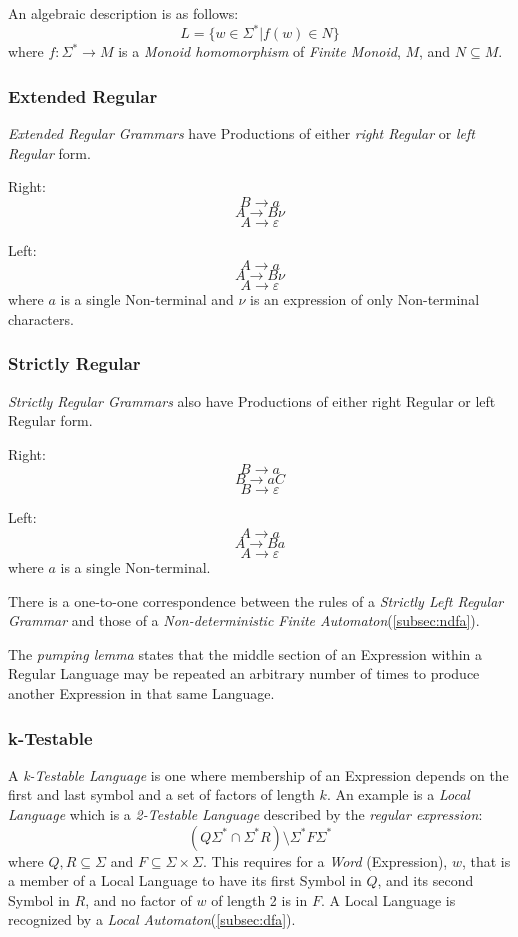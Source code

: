 \documentclass{article}
\begin{document}
An algebraic description is as follows:
\[
    L = \{ w \in \Sigma^* | f(w) \in N \}
\]
where $f : \Sigma^* \rightarrow M$ is a \emph{Monoid homomorphism} of
\emph{Finite Monoid}, $M$, and $N \subseteq M$.

\subsubsection{Extended Regular}
\emph{Extended Regular Grammars} have Productions of either \emph{right
Regular} or \emph{left Regular} form.

Right:
\[
    B \rightarrow a
\]\[
    A \rightarrow B \nu
\]\[
    A \rightarrow \varepsilon
\]

Left:
\[
    A \rightarrow a
\]\[
    A \rightarrow B \nu
\]\[
    A \rightarrow \varepsilon
\]
where $a$ is a single Non-terminal and $\nu$ is an expression of only
Non-terminal characters.

\subsubsection{Strictly Regular}
\emph{Strictly Regular Grammars} also have Productions of either right
Regular or left Regular form.

Right:
\[
    B \rightarrow a
\]\[
    B \rightarrow aC
\]\[
    B \rightarrow \varepsilon
\]

Left:
\[
    A \rightarrow a
\]\[
    A \rightarrow Ba
\]\[
    A \rightarrow \varepsilon
\]
where $a$ is a single Non-terminal.

There is a one-to-one correspondence between the rules of a
\emph{Strictly Left Regular Grammar} and those of a
\emph{Non-deterministic Finite Automaton}(\ref{subsec:ndfa}).

The \emph{pumping lemma} states that the middle section of an
Expression within a Regular Language may be repeated an arbitrary
number of times to produce another Expression in that same Language.

\subsubsection{k-Testable}\label{subsec:k_testable}
A \emph{k-Testable Language} is one where membership of an Expression
depends on the first and last symbol and a set of factors of length
$k$. An example is a \emph{Local Language} which is a \emph{2-Testable
  Language} described by the \emph{regular expression}:
\[
    (Q\Sigma^* \cap \Sigma^*R)\setminus\Sigma^*F\Sigma^*
\]
where $Q,R \subseteq \Sigma$ and $F \subseteq \Sigma \times
\Sigma$. This requires for a \emph{Word} (Expression), $w$, that is a
member of a Local Language to have its first Symbol in $Q$, and its
second Symbol in $R$, and no factor of $w$ of length 2 is in $F$. A
Local Language is recognized by a \emph{Local
  Automaton}(\ref{subsec:dfa}).
\end{document}
